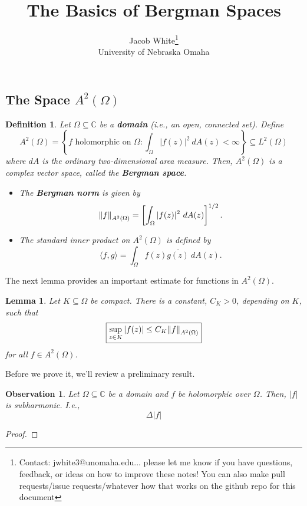 \documentclass[10pt]{article}
\title{\textbf{The Basics of Bergman Spaces}}
\date{}
\author{Jacob White\footnote{Contact: jwhite3@unomaha.edu... please let me know if you have questions, feedback, or ideas on how to improve these notes! You can also make pull requests/issue requests/whatever how that works on the github repo for this document} \\ University of Nebraska Omaha}
\theoremstyle{plain}
\newtheorem{definition}{Definition}
\newtheorem{lemma}{Lemma}
\newtheorem{observation}{Observation}
\begin{document}
	\maketitle 
	

\subsection*{The Space $A^2(\Omega)$}

	\begin{definition}
		Let $\Omega \subseteq \mathbb{C}$ be a \textbf{\textit{domain}} (i.e., an open, connected set). Define $$A^2(\Omega) = \left\{f \text{ holomorphic on } \Omega: \int_\Omega |f(z)|^2 \ dA(z) < \infty\right\} \subseteq L^2(\Omega)$$ where $dA$ is the ordinary two-dimensional area measure. Then, $A^2(\Omega)$ is a complex vector space, called the \textbf{\textit{Bergman space}}. 
			\begin{itemize}
				\item The \textbf{\textit{Bergman norm}} is given by $$\norm{f}_{A^2(\Omega)} = \left[\int_\Omega |f(z)|^2  \ dA(z)\right]^{1/2}.$$
				
				\item The standard inner product on $A^2(\Omega)$ is defined by $$\langle f, g \rangle = \int_\Omega f(z) \overline{g(z)} \ dA(z).$$
			\end{itemize} 
	\end{definition}
	
	The next lemma provides an important estimate for functions in $A^2(\Omega)$. 
	
	\begin{lemma}
		Let $K \subseteq \Omega$ be compact. There is a constant, $C_K > 0$, depending on $K$, such that $$\boxed{\sup_{z \in K} |f(z)| \leq C_K \norm{f}_{A^2(\Omega)}}$$ for all $f \in A^2(\Omega)$. 
	\end{lemma} 
	
	\noindent Before we prove it, we'll review a preliminary result. 
	
	\newpage 
	\begin{observation}
		Let $\Omega \subseteq \mathbb{C}$ be a domain and $f$ be holomorphic over $\Omega$. Then, $|f|$ is subharmonic. I.e., $$\Delta |f| $$
	\end{observation}
		\begin{proof}
			
		\end{proof}
\end{document}
